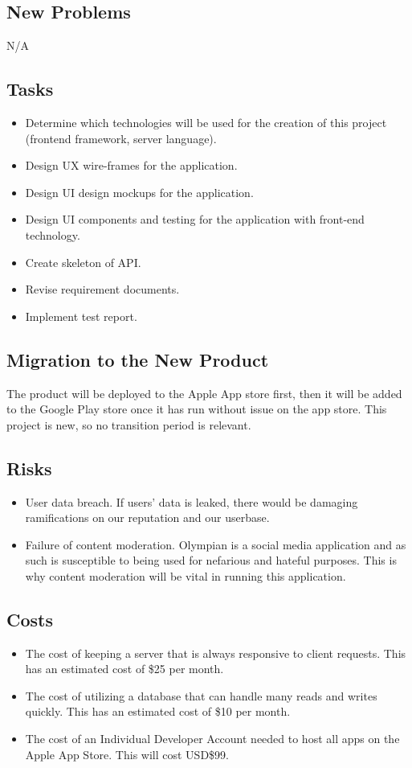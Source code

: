 \documentclass[12pt]{article}
\begin{document}
		\subsection{New Problems}
			N/A
		\subsection{Tasks}
			\begin{itemize}
			\item Determine which technologies will be used for the creation of this project (frontend framework, server language).
			\item  Design UX wire-frames for the application.
			\item  Design UI design mockups for the application.
			\item  Design UI components and testing for the application with front-end technology.
			\item  Create skeleton of API.
			\item  Revise requirement documents.
			\item  Implement test report.
			\end{itemize}
		\subsection{Migration to the New Product}
			The product will be deployed to the Apple App store first, then it will be added to the Google Play store once it has run without issue on the app store.
			This project is new, so no transition period is relevant.
		\subsection{Risks}
			\begin{itemize}
			\item User data breach. If users' data is leaked, there would be damaging ramifications on our reputation and our userbase.
			\item Failure of content moderation. Olympian is a social media application and as such is susceptible to being used for nefarious and hateful purposes. This is why content moderation will be vital in running this application.
			\end{itemize}
		\subsection{Costs}
			\begin{itemize}
			\item The cost of keeping a server that is always responsive to client requests. This has an estimated cost of \$25 per month.
			\item The cost of utilizing a database that can handle many reads and writes quickly. This has an estimated cost of \$10 per month.
			\item The cost of an Individual Developer Account needed to host all apps on the Apple App Store. This will cost USD\$99.
			\end{itemize}
\end{document}
